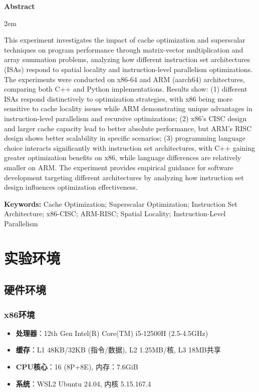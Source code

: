 \documentclass[a4paper,colorlinks=true,linkcolor=blue,urlcolor=blue,citecolor=green,bookmarks=true]{article}
\newenvironment{enabstract}{
    \par\small
    \noindent\mbox{}\par\vspace{-\baselineskip}
    \par\parindent 2em
    }
    {\par\vspace{1em}}
\begin{document}
\begin{center}{\bfseries{Abstract}}\end{center}\par\vspace{0.5em}
\begin{enabstract}
This experiment investigates the impact of cache optimization and superscalar techniques on program performance through matrix-vector multiplication and array summation problems, analyzing how different instruction set architectures (ISAs) respond to spatial locality and instruction-level parallelism optimizations. The experiments were conducted on x86-64 and ARM (aarch64) architectures, comparing both C++ and Python implementations. Results show: (1) different ISAs respond distinctively to optimization strategies, with x86 being more sensitive to cache locality issues while ARM demonstrating unique advantages in instruction-level parallelism and recursive optimizations; (2) x86's CISC design and larger cache capacity lead to better absolute performance, but ARM's RISC design shows better scalability in specific scenarios; (3) programming language choice interacts significantly with instruction set architectures, with C++ gaining greater optimization benefits on x86, while language differences are relatively smaller on ARM. The experiment provides empirical guidance for software development targeting different architectures by analyzing how instruction set design influences optimization effectiveness.

\vspace{1em}
\noindent\textbf{Keywords:} Cache Optimization; Superscalar Optimization; Instruction Set Architecture; x86-CISC; ARM-RISC; Spatial Locality; Instruction-Level Parallelism
\end{enabstract}

\clearpage
\tableofcontents
\clearpage

\section{实验环境}

\subsection{硬件环境}

\subsubsection{x86环境}
\begin{itemize}
  \item \textbf{处理器}：12th Gen Intel(R) Core(TM) i5-12500H (2.5-4.5GHz)
  \item \textbf{缓存}：L1 48KB/32KB (指令/数据), L2 1.25MB/核, L3 18MB共享
  \item \textbf{CPU核心}：16 (8P+8E), 内存：7.6GiB
  \item \textbf{系统}：WSL2 Ubuntu 24.04, 内核 5.15.167.4
\end{itemize}
\end{document}
